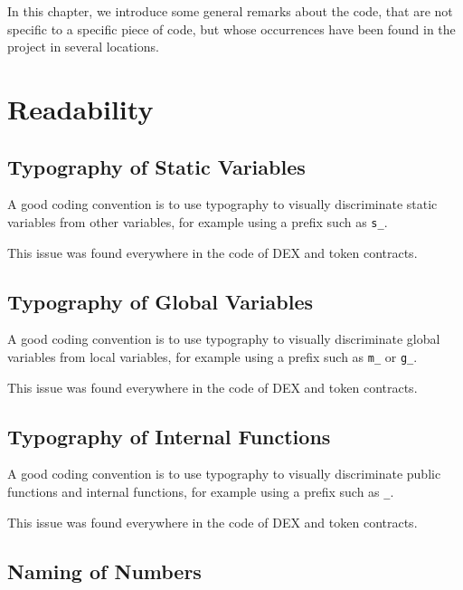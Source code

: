 
In this chapter, we introduce some general remarks about the code,
that are not specific to a specific piece of code, but whose
occurrences have been found in the project in several locations.

\section{Readability}

\subsection{Typography of Static Variables}
\label{readability:static}

A good coding convention is to use typography to visually discriminate
static variables from other variables, for example using a prefix such
as {\tt s\_}.

This issue was found everywhere in the code of DEX and token
contracts.\\

\subsection{Typography of Global Variables}
\label{readability:global}

A good coding convention is to use typography to visually discriminate
global variables from local variables, for example using a prefix such
as {\tt m\_} or {\tt g\_}.

This issue was found everywhere in the code of DEX and token contracts.\\

\subsection{Typography of Internal Functions}
\label{readability:internal}

A good coding convention is to use typography to visually discriminate
public functions and internal functions, for example using a prefix
such as {\tt \_}.

This issue was found everywhere in the code of DEX and token contracts.\\

\subsection{Naming of Numbers}
\label{readability:constants}

